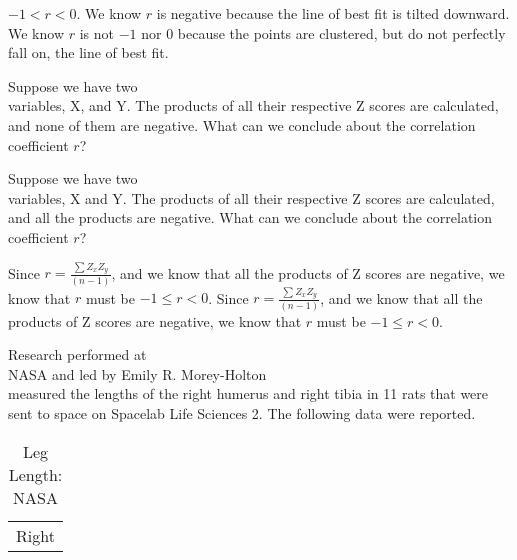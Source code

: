 \documentclass[11pt]{book}\usepackage[]{graphicx}\usepackage[]{color}
\begin{document}
\begin{exercises}
\begin{solution}
$ -1 < r < 0$. We know $r$ is negative because the line of best fit is tilted downward. We know $r$ is not $-1$ nor $0$ because the points are clustered, but do not perfectly fall on, the line of best fit.

\end{solution}

\begin{exercise} %

Suppose we have two \\ variables, X, and Y. The products of all their respective Z scores are calculated, and none of them are negative. What can we conclude about the correlation coefficient $r$?
\end{exercise}
\begin{solution} %

\end{solution}

\begin{exercise} %

Suppose we have two \\ variables, X and Y. The products of all their respective Z scores are calculated, and all the products are negative. What can we conclude about the correlation coefficient $r$?
\end{exercise}
\begin{solution} %

Since $ r = \frac{ \sum Z_x Z_y}{(n - 1)}$, and we know that all the products of Z scores are negative, we know that $r$ must be $-1 \le r < 0$. Since $ r = \frac{ \sum Z_x Z_y}{(n - 1)}$, and we know that all the products of Z scores are negative, we know that $r$ must be $-1 \le r < 0$.
\end{solution}

\begin{exercise}  %

Research performed at \\ NASA and led by Emily R. Morey-Holton \\ measured the lengths of the right humerus and right tibia in 11 rats that were sent to space on Spacelab Life Sciences 2.  The following data were reported. 

	\begin{table}[ht] 
		
		\begin{center}
		\caption{Leg Length: NASA}
		\begin{tabular}{@{} c c @{}} 
		\multicolumn{2}{c}{Right} \\


\end{tabular}
\end{center}
\end{table}
\end{exercise}
\end{exercises}
\end{document}
